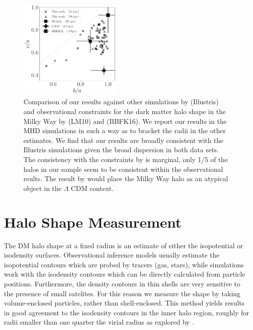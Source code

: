 \documentclass[a4paper,fleqn,usenatbib]{mnras}
\begin{document}
\begin{figure}
\begin{center}
\includegraphics[width=0.45\textwidth]{triaxiality_observations.pdf}
\end{center}
\caption{Comparison of our results against other simulations
  by \citet{Chua19} (Illustris) and observational constraints for the 
dark matter halo shape in the Milky Way by \citet{LM10} (LM10) and
\citet{Bovy16} (BBFK16).   
We report our results in the MHD simulations in such a way as to
bracket the radii in the other estimates.
We find that our results are broadly consistent with the Illustris
simulations given the broad dispersion in both data sets.
The consistency with the constraints by \citet{Bovy16} is marginal,
only 1/5 of the halos in our sample seem to be consistent within the
observational reults.
The result by \citet{LM10} would place the Milky Way halo as an
atypical object in the $\Lambda$ CDM context.} 
\label{fig:observations}
\end{figure}


\section{Halo Shape Measurement}


The DM halo shape at a fixed radius is an estimate of either
the isopotential or isodensity surfaces.  
Observational inference models usually estimate the 
isopotential contours which are probed by tracers (gas, stars), while
simulations work with the isodensity contours which can be directly
calculated from particle positions.  
Furthermore, the density contours in thin shells are very sensitive to
the presence of small satelites.  
For this reason we measure the shape by taking
volume-enclosed particles, rather than shell-enclosed.  
This method yields results in good agreement to the isodensity
contours in the inner halo region, roughly for radii smaller than one
quarter the virial radius as explored by
\citep{Vera-Ciro_et_al._2011}. 
\end{document}
